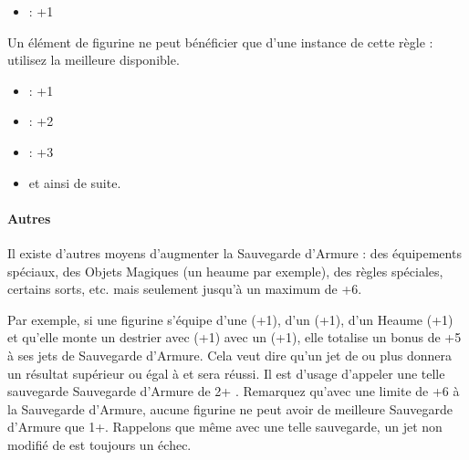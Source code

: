 \begin{multicols}{2}
\noindent\begin{itemize}[label={-}, topsep=0cm, itemsep=0pt]
\item \shield{} : +1
\end{itemize}

\vspace{3.25ex plus 1ex minus .2ex}
\begin{center}\noindent\textbf{\newfromWHB{\innatedefence{}}}\end{center}
\vspace{1.5ex plus .2ex}

Un élément de figurine ne peut bénéficier que d'une instance de cette règle : utilisez la meilleure disponible.

\noindent\begin{itemize}[label={-}, topsep=0cm, itemsep=0pt]
\item {} : +1
\item {} : +2
\item {} : +3
\item et ainsi de suite.
\end{itemize}

\end{multicols}

\paragraph{Autres}

Il existe d'autres moyens d'augmenter la Sauvegarde d'Armure : des équipements spéciaux, des Objets Magiques (un heaume par exemple), des règles spéciales, certains sorts, etc. mais seulement jusqu'à un maximum de +6.

Par exemple, si une figurine s'équipe d'une \la{} (+1), d'un \shield{} (+1), d'un Heaume (+1) et qu'elle monte un destrier avec  (+1) avec un \barding{} (+1), elle totalise un bonus de +5 à ses jets de Sauvegarde d'Armure. Cela veut dire qu'un jet de  ou plus donnera un résultat supérieur ou égal à  et sera réussi. Il est d'usage d'appeler une telle sauvegarde \og Sauvegarde d'Armure de 2+ \fg{}. Remarquez qu'avec une limite de +6 à la Sauvegarde d'Armure, aucune figurine ne peut avoir de meilleure Sauvegarde d'Armure que 1+. Rappelons que même avec une telle sauvegarde, un jet non modifié de  est toujours un échec.
